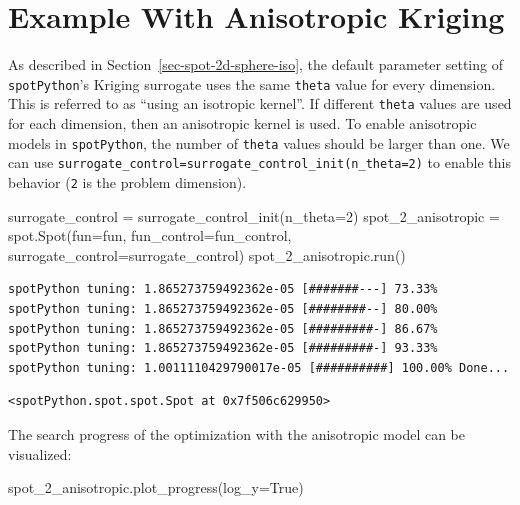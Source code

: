 \documentclass[
  letterpaper,
  DIV=11,
  numbers=noendperiod]{scrreprt}
\newenvironment{Shaded}{\begin{snugshade}}{\end{snugshade}}
\newcommand{\DecValTok}[1]{\textcolor[rgb]{0.68,0.00,0.00}{#1}}
\newcommand{\NormalTok}[1]{\textcolor[rgb]{0.00,0.23,0.31}{#1}}
\newcommand{\OperatorTok}[1]{\textcolor[rgb]{0.37,0.37,0.37}{#1}}
\newcommand{\VariableTok}[1]{\textcolor[rgb]{0.07,0.07,0.07}{#1}}
\begin{document}
\section{Example With Anisotropic
Kriging}\label{example-with-anisotropic-kriging}

As described in Section~\ref{sec-spot-2d-sphere-iso}, the default
parameter setting of \texttt{spotPython}'s Kriging surrogate uses the
same \texttt{theta} value for every dimension. This is referred to as
``using an isotropic kernel''. If different \texttt{theta} values are
used for each dimension, then an anisotropic kernel is used. To enable
anisotropic models in \texttt{spotPython}, the number of \texttt{theta}
values should be larger than one. We can use
\texttt{surrogate\_control=surrogate\_control\_init(n\_theta=2)} to
enable this behavior (\texttt{2} is the problem dimension).

\begin{Shaded}
\begin{Highlighting}[]
\NormalTok{surrogate\_control }\OperatorTok{=}\NormalTok{ surrogate\_control\_init(n\_theta}\OperatorTok{=}\DecValTok{2}\NormalTok{)}
\NormalTok{spot\_2\_anisotropic }\OperatorTok{=}\NormalTok{ spot.Spot(fun}\OperatorTok{=}\NormalTok{fun,}
\NormalTok{                    fun\_control}\OperatorTok{=}\NormalTok{fun\_control,}
\NormalTok{                    surrogate\_control}\OperatorTok{=}\NormalTok{surrogate\_control)}
\NormalTok{spot\_2\_anisotropic.run()}
\end{Highlighting}
\end{Shaded}

\begin{verbatim}
spotPython tuning: 1.865273759492362e-05 [#######---] 73.33% 
spotPython tuning: 1.865273759492362e-05 [########--] 80.00% 
spotPython tuning: 1.865273759492362e-05 [#########-] 86.67% 
spotPython tuning: 1.865273759492362e-05 [#########-] 93.33% 
spotPython tuning: 1.0011110429790017e-05 [##########] 100.00% Done...
\end{verbatim}

\begin{verbatim}
<spotPython.spot.spot.Spot at 0x7f506c629950>
\end{verbatim}

The search progress of the optimization with the anisotropic model can
be visualized:

\begin{Shaded}
\begin{Highlighting}[]
\NormalTok{spot\_2\_anisotropic.plot\_progress(log\_y}\OperatorTok{=}\VariableTok{True}\NormalTok{)}
\end{Highlighting}
\end{Shaded}
\end{document}
